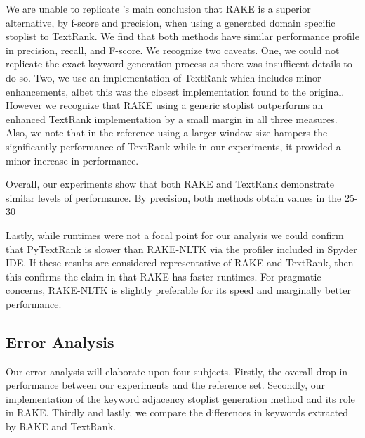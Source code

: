\documentclass[11pt,a4paper]{article}
\begin{document}
We are unable to replicate \citet{1}'s main conclusion that RAKE is a superior alternative, by f-score and precision, when using a generated domain specific stoplist to TextRank. We find that both methods have similar performance profile in precision, recall, and F-score. We recognize two caveats. One, we could not replicate the exact keyword generation process as there was insufficent details to do so. Two, we use an implementation of TextRank which includes minor enhancements, albet this was the closest implementation found to the original. However we recognize that RAKE using a generic stoplist outperforms an enhanced TextRank implementation by a small margin in all three measures. Also, we note that in the reference using a larger window size hampers the significantly performance of TextRank while in our experiments, it provided a minor increase in performance.   

Overall, our experiments show that both RAKE and TextRank demonstrate similar levels of performance. By precision, both methods obtain values in the 25-30%

Lastly, while runtimes were not a focal point for our analysis we could confirm that PyTextRank is slower than RAKE-NLTK via the profiler included in Spyder IDE. If these results are considered representative of RAKE and TextRank, then this confirms the claim in \citet{1} that RAKE has faster runtimes. For pragmatic concerns, RAKE-NLTK is slightly preferable for its speed and marginally better performance.

\subsection{Error Analysis}
Our error analysis will elaborate upon four subjects. Firstly, the overall drop in performance between our experiments and the reference set. Secondly, our implementation of the keyword adjacency stoplist generation method and its role in RAKE. Thirdly and lastly, we compare the differences in keywords extracted by RAKE and TextRank.
\end{document}
